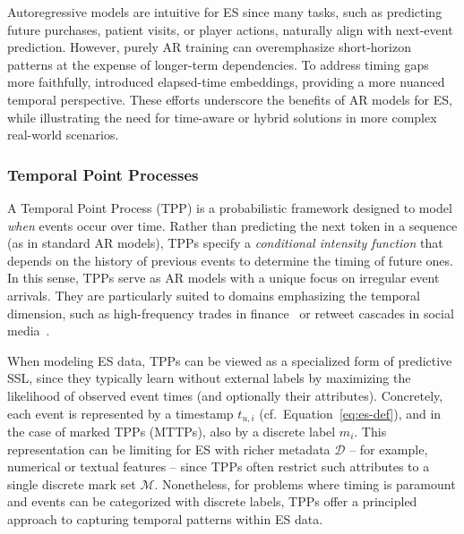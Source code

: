 \documentclass[twoside,11pt]{article}
\begin{document}
Autoregressive models are intuitive for ES since many tasks, such as predicting future purchases, patient visits, or player actions, naturally align with next-event prediction. However, purely AR training can overemphasize short-horizon patterns at the expense of longer-term dependencies. To address timing gaps more faithfully,  introduced elapsed-time embeddings, providing a more nuanced temporal perspective. These efforts underscore the benefits of AR models for ES, while illustrating the need for time-aware or hybrid solutions in more complex real-world scenarios.

\subsubsection{Temporal Point Processes}
\label{subsubsec:tpp}

A Temporal Point Process (TPP) is a probabilistic framework designed to model \emph{when} events occur over time. Rather than predicting the next token in a sequence (as in standard AR models), TPPs specify a \emph{conditional intensity function} that depends on the history of previous events to determine the timing of future ones. In this sense, TPPs serve as AR models with a unique focus on irregular event arrivals. They are particularly suited to domains emphasizing the temporal dimension, such as high-frequency trades in finance~ or retweet cascades in social media~.

When modeling ES data, TPPs can be viewed as a specialized form of predictive SSL, since they typically learn without external labels by maximizing the likelihood of observed event times (and optionally their attributes). Concretely, each event is represented by a timestamp $t_{u,i}$ (cf.~Equation~\ref{eq:es-def}), and in the case of marked TPPs (MTTPs), also by a discrete label $m_i$. This representation can be limiting for ES with richer metadata $\mathcal{D}$ -- for example, numerical or textual features -- since TPPs often restrict such attributes to a single discrete mark set $\mathcal{M}$. Nonetheless, for problems where timing is paramount and events can be categorized with discrete labels, TPPs offer a principled approach to capturing temporal patterns within ES data.
\end{document}
